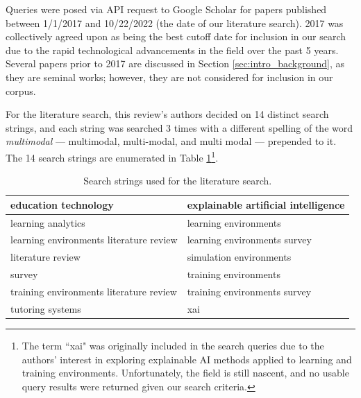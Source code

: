 \documentclass[manuscript,screen,review]{acmart}
\begin{document}
Queries were posed via API request to Google Scholar for papers published between 1/1/2017 and 10/22/2022 (the date of our literature search). 2017 was collectively agreed upon as being the best cutoff date for inclusion in our search due to the rapid technological advancements in the field over the past 5 years. Several papers prior to 2017 are discussed in Section \ref{sec:intro_background}, as they are seminal works; however, they are not considered for inclusion in our corpus. 

For the literature search, this review's authors decided on 14 distinct search strings, and each string was searched 3 times with a different spelling of the word \textit{multimodal} --- multimodal, multi-modal, and multi modal --- prepended to it. The 14 search strings are enumerated in Table \ref{tab:search_terms}\footnote{The term ``xai" was originally included in the search queries due to the authors' interest in exploring explainable AI methods applied to learning and training environments. Unfortunately, the field is still nascent, and no usable query results were returned given our search criteria.}.

\begin{table}[htbp]
    \renewcommand{\arraystretch}{1.3}%
    \centering
    \caption{Search strings used for the literature search.}
    \begin{tabularx}{\linewidth}{l@{\hskip .25in} l@{\hskip .25in}}
    
        \midrule
        education technology & explainable artificial intelligence \\

        \midrule
        learning analytics & learning environments \\
        
        \midrule
        learning environments literature review & learning environments survey \\
    
        \midrule
        literature review & simulation environments \\
        
        \midrule
        survey & training environments \\
        
        \midrule
        training environments literature review & training environments survey \\
        
        \midrule
        tutoring systems & xai \\

        \bottomrule
    \end{tabularx}
    \label{tab:search_terms}
\end{table}
\end{document}
